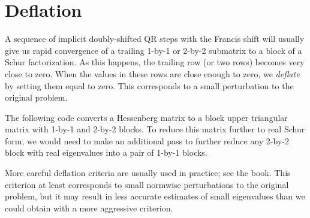 \section*{Deflation}

A sequence of implicit doubly-shifted QR steps with the Francis shift
will usually give us rapid convergence of a trailing 1-by-1 or 2-by-2
submatrix to a block of a Schur factorization.  As this happens,
the trailing row (or two rows) becomes very close to zero.  When the
values in these rows are close enough to zero, we {\em deflate} by
setting them equal to zero.  This corresponds to a small perturbation
to the original problem.

The following code converts a Hessenberg matrix to a block upper triangular
matrix with 1-by-1 and 2-by-2 blocks.  To reduce this matrix further to
real Schur form, we would need to make an additional pass to further
reduce any 2-by-2 block with real eigenvalues into a pair of 1-by-1 blocks.



More careful deflation criteria are usually used in practice;
see the book.  This criterion at least corresponds to small normwise
perturbations to the original problem, but it may result in less
accurate estimates of small eigenvalues than we could obtain with
a more aggressive criterion.
